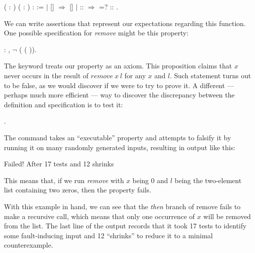 \begin{coqdoccode}
	\coqdocnoindent
	  ( : ) ( :  ) :   :=\coqdoceol
	\coqdocindent{1.00em}
	  \coqdoceol
	\coqdocindent{2.00em}
	\ensuremath{|} []   \ensuremath{\Rightarrow} []\coqdoceol
	\coqdocindent{2.00em}
	\ensuremath{|} :: \ensuremath{\Rightarrow}   =?      ::   \coqdoceol
	\coqdocindent{1.00em}
	.\coqdoceol
\end{coqdoccode}

We can write assertions that represent our expectations regarding this function. One possible specification for \emph{remove} might be this property:

\begin{coqdoccode}
	\coqdocnoindent
	  : \coqdockw{\ensuremath{\forall}}  ,  \ensuremath{\lnot} (  (  )).\coqdoceol
\end{coqdoccode}

The keyword  treats our property  as an axiom. This proposition claims that $ x $ never occurs in the result of $ \mathit{remove} \ x \ l $ for any $ x $ and $ l $. Such statement turns out to be false, as we would discover if we were to try to prove it. A different — perhaps much more efficient — way to discover the discrepancy between the definition and specification is to test it:

\begin{coqdoccode}
	\coqdocnoindent
	 .\coqdoceol
\end{coqdoccode}

The  command takes an ``executable'' property and attempts to falsify it by running it on many randomly generated inputs, resulting in output like this:

\begin{coqdoccode}
	 \coqdoceol
	\coqdocnoindent
	[0, 0] \coqdoceol
	\coqdocnoindent
	Failed! After 17 tests and 12 shrinks \coqdoceol
\end{coqdoccode}

This means that, if we run \emph{remove} with $ x $ being 0 and $ l $ being the two-element list containing two zeros, then the property  fails.

With this example in hand, we can see that the \emph{then} branch of remove fails to make a recursive call, which means that only one occurrence of $ x $ will be removed from the list. The last line of the output records that it took 17 tests to identify some fault-inducing input and 12 ``shrinks'' to reduce it to a minimal counterexample.

